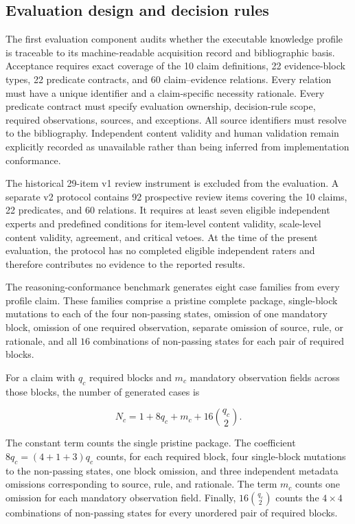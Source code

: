 \documentclass[11pt,a4paper]{article}
\begin{document}
\subsection{Evaluation design and decision rules}
\label{subsec:experimental-design}
The first evaluation component audits whether the executable knowledge profile is traceable to its machine-readable acquisition record and bibliographic basis. Acceptance requires exact coverage of the 10 claim definitions, 22 evidence-block types, 22 predicate contracts, and 60 claim--evidence relations. Every relation must have a unique identifier and a claim-specific necessity rationale. Every predicate contract must specify evaluation ownership, decision-rule scope, required observations, sources, and exceptions. All source identifiers must resolve to the bibliography. Independent content validity and human validation remain explicitly recorded as unavailable rather than being inferred from implementation conformance.

The historical 29-item v1 review instrument is excluded from the evaluation. A separate v2 protocol contains 92 prospective review items covering the 10 claims, 22 predicates, and 60 relations. It requires at least seven eligible independent experts and predefined conditions for item-level content validity, scale-level content validity, agreement, and critical vetoes. At the time of the present evaluation, the protocol has no completed eligible independent raters and therefore contributes no evidence to the reported results.

The reasoning-conformance benchmark generates eight case families from every profile claim. These families comprise a pristine complete package, single-block mutations to each of the four non-passing states, omission of one mandatory block, omission of one required observation, separate omission of source, rule, or rationale, and all $16$ combinations of non-passing states for each pair of required blocks.

For a claim with $q_c$ required blocks and $m_c$ mandatory observation fields across those blocks, the number of generated cases is

\begin{equation}
N_c=1+8q_c+m_c+16\binom{q_c}{2}.
\label{eq:contract-case-count}
\end{equation}

The constant term counts the single pristine package. The coefficient $8q_c=(4+1+3)q_c$ counts, for each required block, four single-block mutations to the non-passing states, one block omission, and three independent metadata omissions corresponding to source, rule, and rationale. The term $m_c$ counts one omission for each mandatory observation field. Finally, $16\binom{q_c}{2}$ counts the $4\times4$ combinations of non-passing states for every unordered pair of required blocks.
\end{document}
